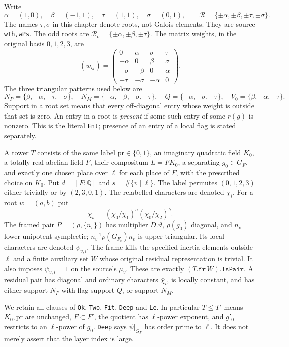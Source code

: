 Write
\[
 \alpha=(1,0),\quad \beta=(-1,1),\quad
 \tau=(1,1),\quad \sigma=(0,1),\qquad
 \mathcal R=\{\pm\alpha,\pm\beta,\pm\tau,\pm\sigma\}.
 \tag{UX.1}
\]
The names $\tau,\sigma$ in this chapter denote roots, not Galois
elements.  They are source \texttt{wTh,wPs}.  The odd roots are
$\mathcal R_o=\{\pm\alpha,\pm\beta,\pm\tau\}$.  The matrix
weights, in the original basis $0,1,2,3$, are
\[
 (w_{ij})=
 \begin{pmatrix}
 0&\alpha&\sigma&\tau\\
 -\alpha&0&\beta&\sigma\\
 -\sigma&-\beta&0&\alpha\\
 -\tau&-\sigma&-\alpha&0
 \end{pmatrix}.
 \tag{UX.2}
\]
The three triangular patterns used below are
\[
 N_P=\{\beta,-\alpha,-\tau,-\sigma\},\quad
 N_M=\{-\alpha,-\beta,-\sigma,-\tau\},\quad
 Q=\{-\alpha,-\sigma,-\tau\},\quad
 V_0=\{\beta,-\alpha,-\tau\}.
 \tag{UX.3}
\]
Support in a root set means that every off-diagonal entry
whose weight is outside that set is zero.  An entry in a
root is \emph{present} if some such entry of some $r(g)$ is
nonzero.  This is the literal \texttt{Ent}; presence of an
entry of a local flag is stated separately.

A tower $T$ consists of the same label
$\mathrm{pr}\in\{0,1\}$, an imaginary quadratic field $K_0$,
a totally real abelian field $F$, their compositum $L=FK_0$,
a separating $g_0\in G_F$, and exactly one chosen place over
$\ell$ for each place of $F$, with the prescribed choice on
$K_0$.  Put $d=[F:\mathbb Q]$ and $s=\#\{v\mid\ell\}$.
The label permutes $(0,1,2,3)$ either trivially or by
$(2,3,0,1)$.  The relabelled characters are denoted $\chi_i$.
For a root $w=(a,b)$ put
\[
 \chi_w=(\chi_0/\chi_1)^a(\chi_0/\chi_2)^b.
 \tag{UX.4}
\]
The framed pair $P=(\rho,\{n_v\})$ has multiplier $D.\vartheta$,
$\rho(g_0)$ diagonal, and $n_v$ lower unipotent symplectic;
$n_v^{-1}\rho(G_{F_v})n_v$ is upper triangular.  Its local
characters are denoted $\psi_{v,i}$.  The frame kills the
specified inertia elements outside $\ell$ and a finite
auxiliary set $W$ whose original residual representation is
trivial.  It also imposes $\psi_{v,i}=1$ on the source's
$\mu_v$.  These are exactly $(T.\mathtt{fr}\,W).\mathtt{IsPair}$.
A residual pair has diagonal and ordinary characters
$\bar\chi_i$, is locally constant, and has either support
$N_P$ with flag support $Q$, or support $N_M$.

We retain all clauses of \texttt{Ok}, \texttt{Two},
\texttt{Fit}, \texttt{Deep} and \texttt{Le}.  In particular
$T\le T'$ means $K_0,\mathrm{pr}$ are unchanged,
$F\subset F'$, the quotient has $\ell$-power exponent, and
$g'_0$ restricts to an $\ell$-power of $g_0$.
\texttt{Deep} says $\psi|_{G_F}$ has order prime to $\ell$.
It does not merely assert that the layer index is large.

